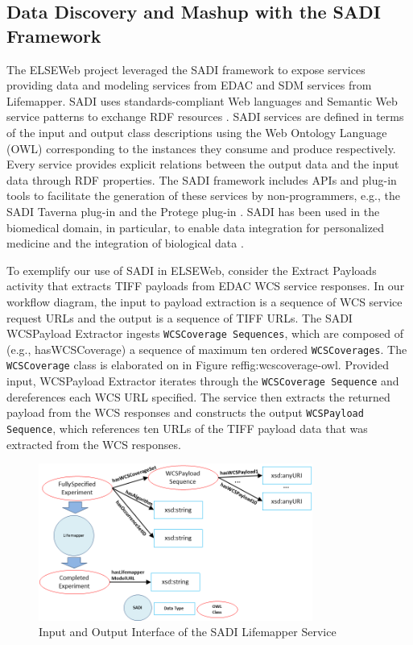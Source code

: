 \documentclass[letterpaper]{article}
\begin{document}
\subsection{Data Discovery and Mashup with the SADI Framework}
The ELSEWeb project leveraged the SADI framework to expose services providing data and modeling services from EDAC and SDM services from Lifemapper. SADI uses standards-compliant Web languages and Semantic Web service patterns to exchange RDF resources \cite{wilkinson2011semantic}. SADI services are defined in terms of the input and output class descriptions using the Web Ontology Language (OWL) \cite{mcguinness2004owl} corresponding to the instances they consume and produce respectively. Every service provides explicit relations between the output data and the input data through RDF properties. The SADI framework includes APIs and plug-in tools to facilitate the generation of these services by non-programmers, e.g., the SADI Taverna plug-in \cite{withers2010semantically} and the Protege plug-in \cite{wilkinson2010sadi}. SADI has been used in the biomedical domain, in particular, to enable data integration for personalized medicine \cite{vandervalk2010share,vandervalk2013sadi} and the integration of biological data \cite{riazanov2012ecotoxicology,callahan2013ontology}. 

To exemplify our use of SADI in ELSEWeb, consider the Extract Payloads activity that extracts TIFF payloads from EDAC WCS service responses. In our workflow diagram, the input to payload extraction is a sequence of WCS service request URLs and the output is a sequence of TIFF URLs. The SADI WCSPayload Extractor ingests {\tt WCSCoverage Sequences}, which are composed of (e.g., hasWCSCoverage) a sequence of maximum ten ordered {\tt WCSCoverages}. The {\tt WCSCoverage} class is elaborated on in Figure ref{fig:wcscoverage-owl}. Provided input, WCSPayload Extractor iterates through the {\tt WCSCoverage Sequence} and dereferences each WCS URL specified. The service then extracts the returned payload from the WCS responses and constructs the output {\tt WCSPayload Sequence}, which references ten URLs of the TIFF payload data that was extracted from the WCS responses.

\begin{figure}
\center
\includegraphics[width=90mm]{images/sadi-lifemapper.png}
\caption{Input and Output Interface of the SADI Lifemapper Service}
\label{fig:sadi-lifemapper}
\end{figure}
\end{document}
